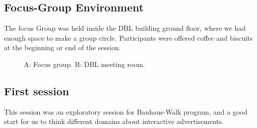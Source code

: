 \subsection{Focus-Group Environment}
The focus Group was held inside the DBL building ground floor, where we had enough space to make a group circle. Participants were offered coffee and biscuits at the beginning or end of the session.


\begin{figure}[H]
    \centering
    \caption{A: Focus group. B: DBL meeting room.}%
    \label{fig:Focus_group_room}%
\end{figure}


\subsection{First session}
This session was an exploratory session for Bauhaus-Walk program, and a good start for us to think different domains about interactive advertisements.

